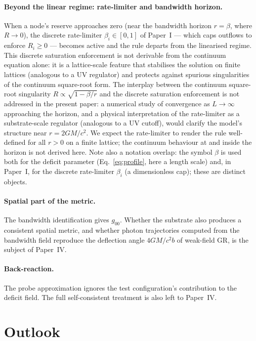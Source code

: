 \documentclass[11pt,a4paper]{article}
\begin{document}
\paragraph{Beyond the linear regime: rate-limiter and
bandwidth horizon.} When a node's reserve approaches zero (near
the bandwidth horizon $r = \beta$, where $R \to 0$), the
discrete rate-limiter $\beta_i \in [0,1]$ of Paper~I --- which
caps outflows to enforce $R_i \ge 0$ --- becomes active and
the rule departs from the linearised regime. This discrete
saturation enforcement is not derivable from the continuum
equation alone: it is a lattice-scale feature that stabilises
the solution on finite lattices (analogous to a UV regulator)
and protects against spurious singularities of the continuum
square-root form. The interplay between
the continuum square-root singularity $R \propto \sqrt{1 -
\beta/r}$ and the discrete saturation enforcement is not
addressed in the present paper: a numerical study of
convergence as $L \to \infty$ approaching the horizon, and a
physical interpretation of the rate-limiter as a
substrate-scale regulator (analogous to a UV cutoff), would
clarify the model's structure near $r = 2GM/c^2$. We expect
the rate-limiter to render the rule well-defined for all
$r > 0$ on a finite lattice; the continuum behaviour at and
inside the horizon is not derived here. Note also a notation
overlap: the symbol $\beta$ is used both for the deficit
parameter (Eq.~\eqref{eq:profile}, here a length scale) and,
in Paper~I, for the discrete rate-limiter $\beta_i$ (a
dimensionless cap); these are distinct objects.

\paragraph{Spatial part of the metric.}
The bandwidth identification gives $g_{00}$. Whether the
substrate also produces a consistent spatial metric, and
whether photon trajectories computed from the bandwidth field
reproduce the deflection angle $4GM/c^2 b$ of weak-field GR,
is the subject of Paper~IV.

\paragraph{Back-reaction.} The probe approximation ignores
the test configuration's contribution to the deficit field.
The full self-consistent treatment is also left to Paper~IV.

\section{Outlook}
\label{sec:outlook}
\end{document}
